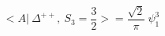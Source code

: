 \begin{equation}
<A|~\Delta^{++},~ S_3=\frac{3}{2} >= \frac{\sqrt{2}}{\pi} ~\psi_1^3
\end{equation}

